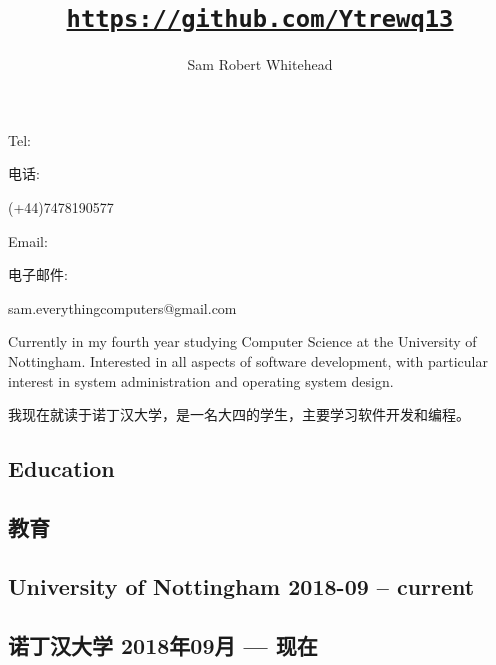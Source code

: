 \documentclass[cv.tex]{subfiles}
\begin{document}
    \title{\href{https://github.com/Ytrewq13}{\texttt{https://github.com/Ytrewq13}}}
    \author{Sam Robert Whitehead}

    \maketitle

    \pagestyle{empty}
    \thispagestyle{empty}

\begin{xen}
    Tel:
\end{xen}
\begin{xcn}
    电话:
\end{xcn}
    (+44)7478190577
    \hfill
\begin{xen}
    Email:
\end{xen}
\begin{xcn}
    电子邮件:
\end{xcn}
    sam.everythingcomputers@gmail.com\\
    \vspace{1mm}
\begin{xen}
    Currently in my fourth year studying Computer Science at the University of
    Nottingham. Interested in all aspects of software development, with
    particular interest in system administration and operating system design.
\end{xen}
\begin{xcn}
    我现在就读于诺丁汉大学，是一名大四的学生，主要学习软件开发和编程。
\end{xcn}
\begin{xen}
    \section{Education}
\end{xen}
\begin{xcn}
    \section{教育}
\end{xcn}
\begin{xen}
    \subsection{University of Nottingham
        \hfill 2018-09 -- current}
\end{xen}
\begin{xcn}
        \subsection{诺丁汉大学
        \hfill 2018年09月 --- 现在}
\end{xcn}
\end{document}
